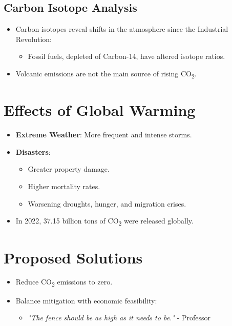 \documentclass[12pt]{article}
\begin{document}
\subsection*{Carbon Isotope Analysis}
\begin{itemize}
    \item Carbon isotopes reveal shifts in the atmosphere since the Industrial Revolution:
    \begin{itemize}
        \item Fossil fuels, depleted of Carbon-14, have altered isotope ratios.
    \end{itemize}
    \item Volcanic emissions are not the main source of rising CO\textsubscript{2}.
\end{itemize}

\section*{Effects of Global Warming}
\begin{itemize}
    \item \textbf{Extreme Weather}: More frequent and intense storms.
    \item \textbf{Disasters}:
    \begin{itemize}
        \item Greater property damage.
        \item Higher mortality rates.
        \item Worsening droughts, hunger, and migration crises.
    \end{itemize}
    \item In 2022, 37.15 billion tons of CO\textsubscript{2} were released globally.
\end{itemize}

\section*{Proposed Solutions}
\begin{itemize}
    \item Reduce CO\textsubscript{2} emissions to zero.
    \item Balance mitigation with economic feasibility:
    \begin{itemize}
        \item \textit{"The fence should be as high as it needs to be."} - Professor
    \end{itemize}
\end{itemize}
\end{document}
